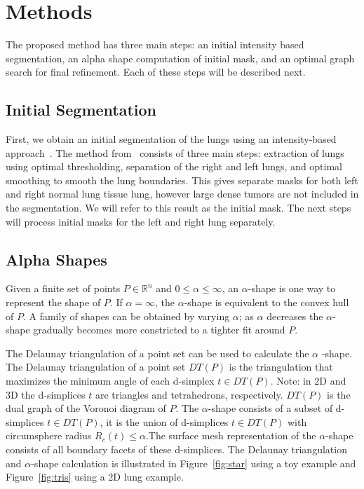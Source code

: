\documentclass{llncs}
\begin{document}
%
\section{Methods}
%
The proposed method has three main steps: an initial intensity based segmentation, an alpha shape computation of initial mask, and an optimal graph search for final refinement. Each of these steps will be described next.
%
\subsection{Initial Segmentation}
%

First, we obtain an initial segmentation of the lungs using an intensity-based approach~\cite{guo2008}. The method from~\cite{guo2008} consists of three main steps: extraction of lungs using optimal thresholding, separation of the right and left lungs, and optimal smoothing to smooth the lung boundaries. This gives separate masks for both left and right normal lung tissue lung, however large dense tumors are not included in the segmentation. We will refer to this result as the initial mask. The next steps will process initial masks for the left and right lung separately. 
%
\subsection{Alpha Shapes}
%
 Given a finite set of points $P \in \mathbb{R}^n$ and $ 0 \leq \alpha \leq \infty $, an $\alpha$-shape is one way to represent the shape of $P$. If $\alpha = \infty$, the $\alpha$-shape is equivalent to the convex hull of $P$. A family of shapes can be obtained by varying $\alpha$; as $\alpha$ decreases the $\alpha$-shape gradually becomes more constricted to a tighter fit around $P$.

The Delaunay triangulation of a point set can be used to calculate the $\alpha$ -shape.  The Delaunay triangulation of a point set $DT(P)$ is the triangulation that maximizes the minimum angle of each d-simplex $t \in DT(P)$. Note: in 2D and 3D the d-simplices $t$ are triangles and tetrahedrons, respectively. $DT(P)$ is the dual graph of the Voronoi diagram of $P$. The $\alpha$-shape consists of a subset of d-simplices $t \in DT(P)$, it is the union of d-simplices $t \in DT(P)$ with circumsphere radius $R_c(t) \leq \alpha$.The surface mesh representation of the $\alpha$-shape consists of all boundary facets of these d-simplices. The Delaunay triangulation and $\alpha$-shape calculation is illustrated in Figure~\ref{fig:star} using a toy example and Figure~\ref{fig:tris} using a 2D lung example.
\end{document}

